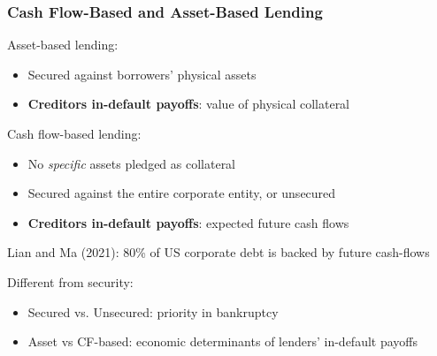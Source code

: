 \documentclass[aspectratio=169,xcolor=table]{beamer}
\begin{document}
\begin{frame}[label = LandM] \frametitle{Cash Flow-Based and Asset-Based Lending \hfill \hyperlink{motivation2}{}}

Asset-based lending:
\begin{itemize} \small
\item Secured against borrowers' physical  assets
\item \textbf{Creditors in-default payoffs}: value of physical collateral
\end{itemize} \normalsize 
Cash flow-based lending:
\begin{itemize} \small
\item No \textit{specific} assets pledged as collateral
\item Secured against the entire corporate entity, or unsecured
\item \textbf{Creditors in-default payoffs}: expected future cash flows
\end{itemize} \normalsize
Lian and Ma (2021): 80\% of US corporate debt is backed by future cash-flows \vspace{3mm}

Different from security: 
\begin{itemize} \small
    \item Secured vs. Unsecured: priority in bankruptcy
        \item Asset vs CF-based: economic determinants of lenders' in-default payoffs
\end{itemize} \normalsize

\end{frame}
\end{document}

